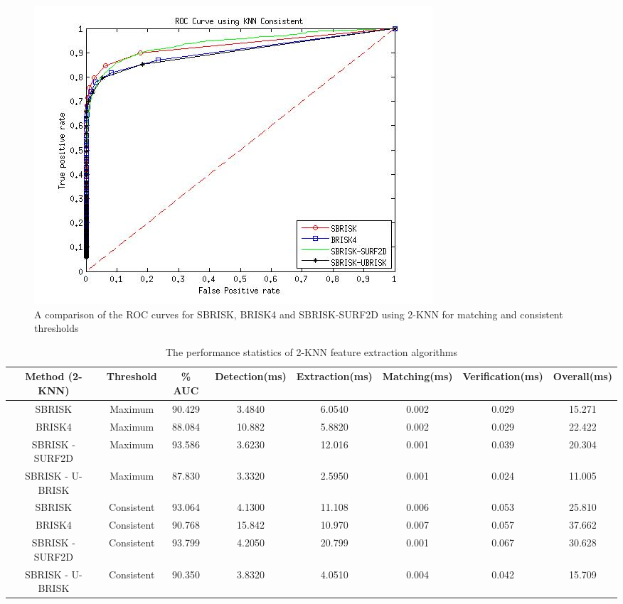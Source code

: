 \documentclass{article}
\begin{document}
\begin{figure}[h!]
\begin{minipage}[b]{0.5\linewidth}
\includegraphics[scale=0.5]{../Drawings/ROC_General_KNN_Consistent.jpg}
\caption{A comparison of the ROC curves for SBRISK, BRISK4 and SBRISK-SURF2D using 2-KNN for matching and consistent thresholds}
\label{fig:compareKNNConsistent}
\end{minipage}
\end{figure}

\begin{table}
\caption{The performance statistics of 2-KNN feature extraction algorithms}
\begin{tabular}{|c|c|c|c|c|c|c|c|}
\hline 
\textbf{Method (2-KNN)} & Threshold & \% AUC & Detection(ms) & Extraction(ms) & Matching(ms) & Verification(ms) & Overall(ms)\tabularnewline
\hline 
\hline 
SBRISK & Maximum & 90.429 & 3.4840 & 6.0540 & 0.002 & 0.029 & 15.271\tabularnewline
\hline 
BRISK4 & Maximum & 88.084 & 10.882 & 5.8820 & 0.002 & 0.029 & 22.422\tabularnewline
\hline 
SBRISK - SURF2D & Maximum & 93.586 & 3.6230 & 12.016 & 0.001 & 0.039 & 20.304\tabularnewline
\hline 
SBRISK - U-BRISK & Maximum & 87.830 & 3.3320 & 2.5950 & 0.001 & 0.024 & 11.005\tabularnewline
\hline 
SBRISK & Consistent & 93.064 & 4.1300 & 11.108 & 0.006 & 0.053 & 25.810\tabularnewline
\hline 
BRISK4 & Consistent & 90.768 & 15.842 & 10.970 & 0.007 & 0.057 & 37.662\tabularnewline
\hline 
SBRISK - SURF2D & Consistent & 93.799 & 4.2050 & 20.799 & 0.001 & 0.067 & 30.628\tabularnewline
\hline 
SBRISK - U-BRISK & Consistent & 90.350 & 3.8320 & 4.0510 & 0.004 & 0.042 & 15.709\tabularnewline
\hline 
\end{tabular}
\label{tab:keypointsMatchesHamming}
\end{table}
\end{document}
